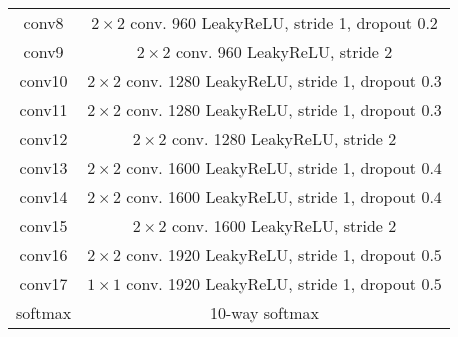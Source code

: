 \documentclass{article} \usepackage{iclr2015,times}
\begin{document}
\begin{appendix}
\begin{table}[h]
\begin{center}
\begin{tabular}{c|c}
conv8 & $2 \times 2$ conv. 960 LeakyReLU, stride 1, dropout $0.2$\\
conv9 & $2 \times 2$ conv. 960 LeakyReLU, stride 2 \\
conv10 & $2 \times 2$ conv. 1280 LeakyReLU, stride 1, dropout $0.3$\\
conv11 & $2 \times 2$ conv. 1280 LeakyReLU, stride 1, dropout $0.3$\\
conv12 & $2 \times 2$ conv. 1280 LeakyReLU, stride 2 \\
conv13 & $2 \times 2$ conv. 1600 LeakyReLU, stride 1, dropout $0.4$\\
conv14 & $2 \times 2$ conv. 1600 LeakyReLU, stride 1, dropout $0.4$\\
conv15 & $2 \times 2$ conv. 1600 LeakyReLU, stride 2 \\
conv16 & $2 \times 2$ conv. 1920 LeakyReLU, stride 1, dropout $0.5$\\
conv17 & $1 \times 1$ conv. 1920 LeakyReLU, stride 1, dropout $0.5$\\
softmax & 10-way softmax
\end{tabular}
\end{center}
\end{table}



\end{appendix}
\end{document}
